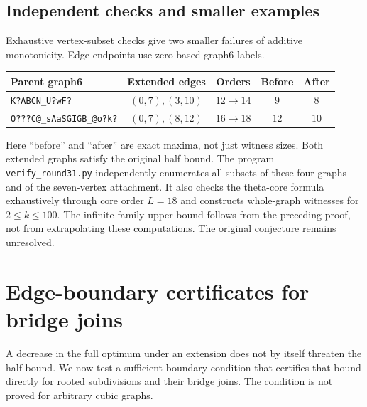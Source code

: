\documentclass[11pt]{article}
\begin{document}
\subsection{Independent checks and smaller examples}
Exhaustive vertex-subset checks give two smaller failures of additive
monotonicity. Edge endpoints use zero-based graph6 labels.
\begin{center}
\begin{tabular}{@{}lcccc@{}}
\toprule
Parent graph6 & Extended edges & Orders & Before & After\\
\midrule
\texttt{K?ABCN\_U?wF?} & $(0,7),(3,10)$ & $12\to14$ & $9$ & $8$\\
\texttt{O???C@\_sAaSGIGB\_@o?k?} & $(0,7),(8,12)$ & $16\to18$ & $12$ & $10$\\
\bottomrule
\end{tabular}
\end{center}
Here ``before'' and ``after'' are exact maxima, not just witness sizes.
Both extended graphs satisfy the original half bound.
The program \texttt{verify\_round31.py} independently enumerates all
subsets of these four graphs and of the seven-vertex attachment.
It also checks the theta-core formula exhaustively through core order
$L=18$ and constructs whole-graph witnesses for $2\leq k\leq100$.
The infinite-family upper bound follows from the preceding proof,
not from extrapolating these computations. The original conjecture
remains unresolved.

\section{Edge-boundary certificates for bridge joins}
A decrease in the full optimum under an extension does not by itself
threaten the half bound. We now test a sufficient boundary condition
that certifies that bound directly for rooted subdivisions and their
bridge joins. The condition is not proved for arbitrary cubic graphs.
\end{document}
